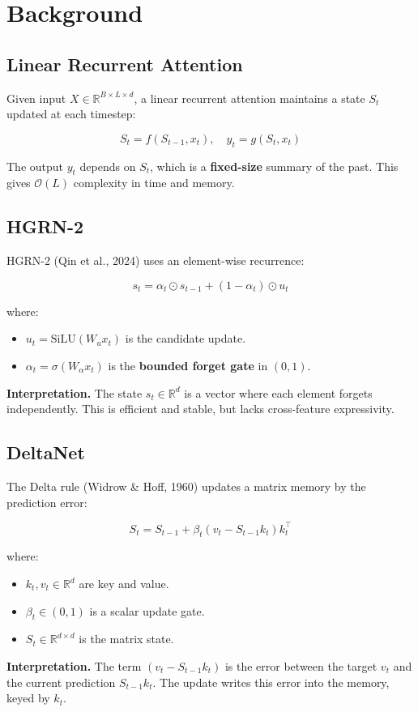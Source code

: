 \section{Background}

\subsection{Linear Recurrent Attention}

Given input $X \in \mathbb{R}^{B \times L \times d}$, a linear recurrent 
attention maintains a state $S_t$ updated at each timestep:

\[
S_t = f(S_{t-1}, x_t), \quad
y_t = g(S_t, x_t)
\tag{3.1}
\]

The output $y_t$ depends on $S_t$, which is a \textbf{fixed-size} summary of the 
past. This gives $\mathcal{O}(L)$ complexity in time and memory.

\subsection{HGRN-2}

HGRN-2 (Qin et al., 2024) uses an element-wise recurrence:

\[
s_t = \alpha_t \odot s_{t-1} + (1 - \alpha_t) \odot u_t
\tag{3.2}
\]

where:

\begin{itemize}
\item $u_t = \text{SiLU}(W_u x_t)$ is the candidate update.
\item $\alpha_t = \sigma(W_\alpha x_t)$ is the \textbf{bounded forget gate} in $(0, 1)$.

\end{itemize}
\textbf{Interpretation.} The state $s_t \in \mathbb{R}^d$ is a vector where each 
element forgets independently. This is efficient and stable, but lacks 
cross-feature expressivity.

\subsection{DeltaNet}

The Delta rule (Widrow \& Hoff, 1960) updates a matrix memory by the 
prediction error:

\[
S_t = S_{t-1} + \beta_t (v_t - S_{t-1} k_t) k_t^\top
\tag{3.3}
\]

where:

\begin{itemize}
\item $k_t, v_t \in \mathbb{R}^d$ are key and value.
\item $\beta_t \in (0, 1)$ is a scalar update gate.
\item $S_t \in \mathbb{R}^{d \times d}$ is the matrix state.

\end{itemize}
\textbf{Interpretation.} The term $(v_t - S_{t-1} k_t)$ is the error between the 
target $v_t$ and the current prediction $S_{t-1} k_t$. The update writes this 
error into the memory, keyed by $k_t$.

